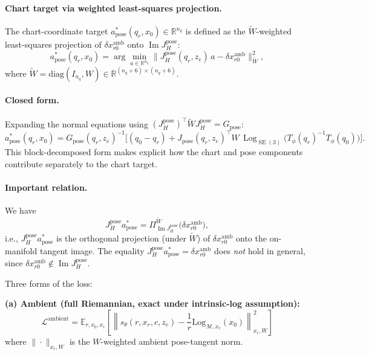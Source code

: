 \documentclass[11pt,a4paper]{article}
\DeclareMathOperator{\Log}{Log}
\DeclareMathOperator{\Image}{Im}
\DeclareMathOperator{\SE}{SE}
\newcommand{\R}{\mathbb{R}}
\newcommand{\E}{\mathbb{E}}
\newcommand{\Loss}{\mathcal{L}}
\newcommand{\Mset}{\mathcal{M}}
\newcommand{\Tphi}{T_\phi}
\newcommand{\Jpose}{J_{\text{pose}}}
\begin{document}
\paragraph{Chart target via weighted least-squares projection.} The chart-coordinate target $a^*_{\text{pose}}(q_r, x_0) \in \R^{n_q}$ is defined as the $\widetilde W$-weighted least-squares projection of $\delta x^{\text{amb}}_{r0}$ onto $\Image J_H^{\text{pose}}$:
\begin{equation}
a^*_{\text{pose}}(q_r, x_0) = \arg\min_{a \in \R^{n_q}} \bigl\| J_H^{\text{pose}}(q_r, z_e) \, a - \delta x^{\text{amb}}_{r0} \bigr\|_{\widetilde W}^2,
\end{equation}
where $\widetilde W = \mathrm{diag}(I_{n_q}, W) \in \R^{(n_q + 6) \times (n_q + 6)}$.

\paragraph{Closed form.} Expanding the normal equations using $(J_H^{\text{pose}})^\top \widetilde W J_H^{\text{pose}} = G_{\text{pose}}$:
\begin{equation}
\boxed{ a^*_{\text{pose}}(q_r, x_0) = G_{\text{pose}}(q_r, z_e)^{-1} \bigl[ (q_0 - q_r) + \Jpose(q_r, z_e)^\top W \, \Log_{\SE(3)}\!\bigl( \Tphi(q_r)^{-1} \Tphi(q_0) \bigr) \bigr]. }
\end{equation}
This block-decomposed form makes explicit how the chart and pose components contribute separately to the chart target.

\paragraph{Important relation.} We have
\begin{equation}
J_H^{\text{pose}} a^*_{\text{pose}} = \Pi_{\Image J_H^{\text{pose}}}^{\widetilde W} \bigl( \delta x^{\text{amb}}_{r0} \bigr),
\end{equation}
i.e., $J_H^{\text{pose}} a^*_{\text{pose}}$ is the orthogonal projection (under $\widetilde W$) of $\delta x^{\text{amb}}_{r0}$ onto the on-manifold tangent image. The equality $J_H^{\text{pose}} a^*_{\text{pose}} = \delta x^{\text{amb}}_{r0}$ does \emph{not} hold in general, since $\delta x^{\text{amb}}_{r0} \notin \Image J_H^{\text{pose}}$.

Three forms of the loss:

\textbf{(a) Ambient (full Riemannian, exact under intrinsic-log assumption):}
\begin{equation}
\Loss^{\text{ambient}} = \E_{r, x_0, x_r} \left[ \left\| s_\theta(r, x_r, c, z_e) - \frac{1}{r} \mathrm{Log}_{\Mset, x_r}(x_0) \right\|^2_{x_r, W} \right]
\end{equation}
where $\| \cdot \|_{x_r, W}$ is the $W$-weighted ambient pose-tangent norm.
\end{document}
